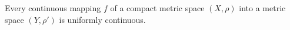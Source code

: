 Every continuous mapping $f$ of a compact metric space $(X, \rho)$ into a metric space $(Y, \rho')$ is uniformly continuous.
